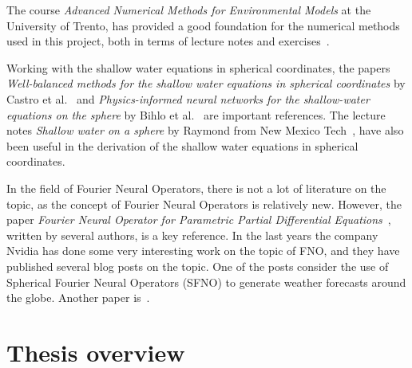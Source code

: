 The course \textit{Advanced Numerical Methods for Environmental Models} at the University of Trento, has provided a good foundation for the numerical methods used in this project, both in terms of lecture notes and exercises~\cite{trento_course}.

Working with the shallow water equations in spherical coordinates, the papers \textit{Well-balanced methods for the shallow water equations in spherical coordinates} by Castro et al.~\cite{Castro2017} and \textit{Physics-informed neural networks for the shallow-water equations on the sphere} by Bihlo et al.~\cite{Bihlo2022} are important references.
The lecture notes \textit{Shallow water on a sphere} by Raymond from New Mexico Tech~\cite{Raymond}, have also been useful in the derivation of the shallow water equations in spherical coordinates.

In the field of Fourier Neural Operators, there is not a lot of literature on the topic, as the concept of Fourier Neural Operators is relatively new.
However, the paper \textit{Fourier Neural Operator for Parametric Partial Differential Equations}~\cite{FNO_2021}, written by several authors, is a key reference.
In the last years the company Nvidia has done some very interesting work on the topic of FNO, and they have published several blog posts on the topic.
One of the posts consider the use of Spherical Fourier Neural Operators (SFNO) to generate weather forecasts around the globe\cite{Nvidia2023}.
Another paper is~\cite{bonev2023-SFNO}.

\section{Thesis overview}




